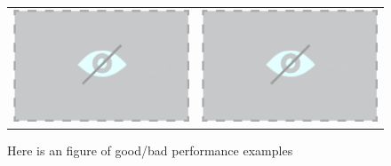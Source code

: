     \begin{figure}
    
        \begin{tabular}{c|c}
            \includegraphics[width=\columnwidth]{Images/NoVisualHolder.png} & \includegraphics[width=\columnwidth]{Images/NoVisualHolder.png}
        \end{tabular}
        
        \caption{Here is an figure of good/bad performance examples}
        \label{fig:FigExample}
        
    \end{figure}

